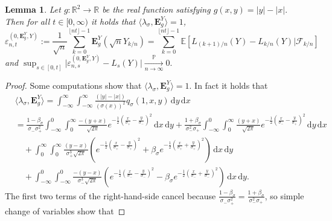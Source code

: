 \documentclass[12pt]{article}
\numberwithin{equation}{section}
\newtheorem{lemma}{Lemma}
\theoremstyle{definition}
\theoremstyle{remark}
\newcommand{\convp}[1][]{\xrightarrow[#1]{\PP}}
\newcommand{\RR}{\mathbb{R}}
\newcommand{\PP}{\mathbb{P}}
\newcommand{\EE}{\mathbb{E}}
\newcommand{\cF}{\mathcal{F}}
\newcommand{\vd}{\,\mathrm{d}}
\newcommand{\bfH}[1]{\mathbf{E}^Y_{#1}}
\begin{document}
\begin{lemma}\label{lem:conv:hatg}
Let $g\colon \RR^2 \to \RR$ be the real function satisfying
$
	g(x,y)=|y|-|x|.
$
Then for all $t\in [0,\infty)$ it holds that $\langle \lambda_\sigma , \bfH{g} \rangle=1$,
\begin{equation}
	\varepsilon_{n,t}^{(0,\bfH{g},Y)} := \frac1{\sqrt{n}}\sum_{k=0}^{\lfloor n t \rfloor-1} \bfH{g} (\sqrt{n}Y_{k/n})
	=  \sum_{k=0}^{\lfloor n t \rfloor-1}  \EE\!\left[  L_{(k+1)/n}(Y) - L_{k/n}(Y) | \cF_{k/n} \right]
\end{equation}
and 
$
	\sup_{s\in [0,t]} \Big| 
\varepsilon_{n,s}^{(0,\bfH{g},Y)} %
- L_s(Y) \Big| \convp[n\to\infty] 0.
$
\end{lemma}
%
%
%
\begin{proof}
Some computations show that $\langle \lambda_\sigma , \bfH{g} \rangle=1$. 
 In fact it holds that
\begin{equation} \begin{split}
	& \langle \lambda_\sigma , \bfH{g} \rangle 
	 = \int_{-\infty}^{\infty} \int_{-\infty}^{\infty} \frac{(|y|-|x|)}{(\sigma(x))^2} q_\sigma(1,x,y) \vd y \vd x
	\\
	& =  \frac{1-{\beta_\sigma}}{\sigma_- \sigma_+^2} \int_{-\infty}^{0} \int_{0}^{\infty} \frac{- (y+x)}{\sqrt{2 \pi}} e^{- \frac12 \left(\frac{x}{\sigma_+}-\frac{y}{\sigma_-}\right)^2} \vd x \vd y
	 +  \frac{1+{\beta_\sigma}}{\sigma_-^2 \sigma_+} \int_{-\infty}^{0} \int_{0}^{\infty}  \frac{(y+x)}{\sqrt{2 \pi}} e^{- \frac12 \left(\frac{x}{\sigma_-}-\frac{y}{\sigma_+}\right)^2} \vd y \vd x
	\\
	& \quad +  \int_{0}^{\infty} \int_{0}^{\infty} \frac{(y-x)}{\sigma_+^3 \sqrt{2 \pi}} 
	\left( e^{- \frac12 \left(\frac{x}{\sigma_+}-\frac{y}{\sigma_+}\right)^2} 
		+ {\beta_\sigma} e^{- \frac12 \left(\frac{x}{\sigma_+}+\frac{y}{\sigma_+}\right)^2} 
	\right)\vd x \vd y 
	\\
	& \quad + \int_{-\infty}^0\int_{-\infty}^0 \frac{-(y-x)}{\sigma_-^3 \sqrt{2 \pi}} 
	\left( e^{- \frac12 \left(\frac{x}{\sigma_-}-\frac{y}{\sigma_-}\right)^2} 
		- {\beta_\sigma} e^{- \frac12 \left(\frac{x}{\sigma_-}+\frac{y}{\sigma_-}\right)^2} 
	\right)\vd x \vd y.
\end{split}\end{equation}
The first two terms of the right-hand-side cancel because $\frac{1-{\beta_\sigma}}{\sigma_- \sigma_+^2} = \frac{1+{\beta_\sigma}}{\sigma_-^2 \sigma_+}$, so simple change of variables show that

\end{proof}
\end{document}
